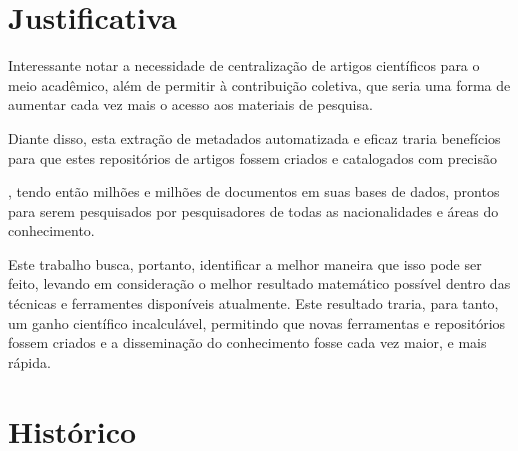 \section{Justificativa}


\begin{textoalterado}
Interessante notar a necessidade de centralização de artigos científicos para o meio acadêmico, além de permitir à contribuição coletiva, que seria uma forma de aumentar cada vez mais o acesso aos materiais de pesquisa. 

Diante disso, esta extração de metadados automatizada e eficaz traria benefícios para que estes repositórios de artigos fossem criados e catalogados com precisão\end{textoalterado}, tendo então milhões e milhões de documentos em suas bases de dados, prontos para serem pesquisados por pesquisadores de todas as nacionalidades e áreas do conhecimento.

\begin{textoalterado}
Este trabalho busca, portanto, identificar a melhor maneira que isso pode ser feito, levando em consideração o melhor resultado matemático possível dentro das técnicas e ferramentes disponíveis atualmente. Este resultado traria, para tanto, um ganho científico incalculável, permitindo que novas ferramentas e repositórios fossem criados e a disseminação do conhecimento fosse cada vez maior, e mais rápida.
\end{textoalterado}

\section{Histórico}


